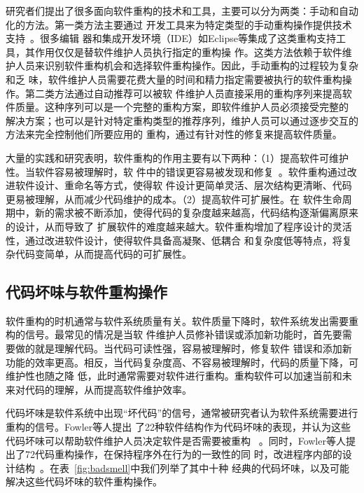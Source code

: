 研究者们提出了很多面向软件重构的技术和工具，主要可以分为两类：手动和自动化的方法。第一类方法主要通过
开发工具来为特定类型的手动重构操作提供技术支持~\cite{fowler1999refactoring, murphy2012we}。很多编辑
器和集成开发环境（IDE）如Eclipse等集成了这类重构支持工具，其作用仅仅是替软件维护人员执行指定的重构操
作。这类方法依赖于软件维护人员来识别软件重构机会和选择软件重构操作。因此，手动重构的过程较为复杂和乏
味，软件维护人员需要花费大量的时间和精力指定需要被执行的软件重构操作。第二类方法通过自动推荐可以被软
件维护人员直接采用的重构序列来提高软件质量\cite{harman2007pareto, kessentini2011design,
ouni2013maintainability, Silva2014}。这种序列可以是一个完整的重构方案，即软件维护人员必须接受完整的
解决方案；也可以是针对特定重构类型的推荐序列，维护人员可以通过逐步交互的方法来完全控制他们所要应用的
重构，通过有针对性的修复来提高软件质量。

大量的实践和研究表明，软件重构的作用主要有以下两种：（1）提高软件可维护性。当软件容易被理解时，软
件中的错误更容易被发现和修复~\cite{martin2009clean}。软件重构通过改进软件设计、重命名等方式，使得软
件设计更简单灵活、层次结构更清晰、代码更易被理解，从而减少代码维护的成本。（2）提高软件可扩展性。在
软件生命周期中，新的需求被不断添加，使得代码的复杂度越来越高，代码结构逐渐偏离原来的设计，从而导致了
扩展软件的难度越来越大。软件重构增加了程序设计的灵活性，通过改进软件设计，使得软件具备高凝聚、低耦合
和复杂度低等特点，将复杂代码变简单，从而提高代码的可扩展性。

\subsection{代码坏味与软件重构操作}
软件重构的时机通常与软件系统质量有关。软件质量下降时，软件系统发出需要重构的信号。最常见的情况是当软
件维护人员修补错误或添加新功能时，首先要需要做的就是理解代码。当代码可读性强，容易被理解时，修复软件
错误和添加新功能的效率更高。相反，当代码复杂度高、不容易被理解时，代码的质量下降，可维护性也随之降
低，此时通常需要对软件进行重构。重构软件可以加速当前和未来对代码的理解，从而提高软件维护效率。

代码坏味是软件系统中出现``坏代码''的信号，通常被研究者认为软件系统需要进行重构的信号。Fowler等人提出
了22种软件结构作为代码坏味的表现，并认为这些代码坏味可以帮助软件维护人员决定软件是否需要被重构
~\cite{fowler1999refactoring}。同时，Fowler等人提出了72代码重构操作，在保持程序外在行为的一致性的同
时，改进程序内部的设计结构~\cite{fowler1999refactoring}。在表~\ref{fig:badsmell}中我们列举了其中十种
经典的代码坏味，以及可能解决这些代码坏味的软件重构操作。

